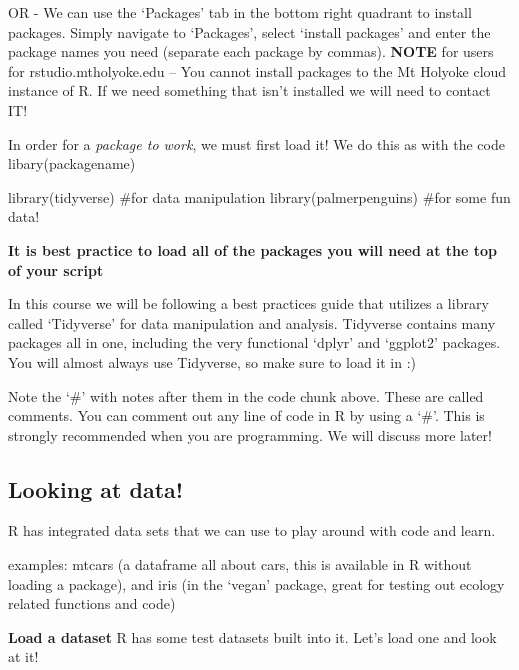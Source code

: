 \documentclass[
  letterpaper,
  DIV=11,
  numbers=noendperiod]{scrartcl}
\newenvironment{Shaded}{\begin{snugshade}}{\end{snugshade}}
\newcommand{\CommentTok}[1]{\textcolor[rgb]{0.37,0.37,0.37}{#1}}
\newcommand{\FunctionTok}[1]{\textcolor[rgb]{0.28,0.35,0.67}{#1}}
\newcommand{\NormalTok}[1]{\textcolor[rgb]{0.00,0.23,0.31}{#1}}
\begin{document}
OR - We can use the `Packages' tab in the bottom right quadrant to
install packages. Simply navigate to `Packages', select `install
packages' and enter the package names you need (separate each package by
commas). \textbf{NOTE} for users for rstudio.mtholyoke.edu -- You cannot
install packages to the Mt Holyoke cloud instance of R. If we need
something that isn't installed we will need to contact IT!

In order for a \emph{package to work}, we must first load it! We do this
as with the code libary(packagename)

\begin{Shaded}
\begin{Highlighting}[]
\FunctionTok{library}\NormalTok{(tidyverse) }\CommentTok{\#for data manipulation}
\FunctionTok{library}\NormalTok{(palmerpenguins) }\CommentTok{\#for some fun data!}
\end{Highlighting}
\end{Shaded}

\textbf{It is best practice to load all of the packages you will need at
the top of your script}

In this course we will be following a best practices guide that utilizes
a library called `Tidyverse' for data manipulation and analysis.
Tidyverse contains many packages all in one, including the very
functional `dplyr' and `ggplot2' packages. You will almost always use
Tidyverse, so make sure to load it in :)

Note the `\#' with notes after them in the code chunk above. These are
called comments. You can comment out any line of code in R by using a
`\#'. This is strongly recommended when you are programming. We will
discuss more later!

\hypertarget{looking-at-data}{%
\subsection{\texorpdfstring{\textbf{Looking at
data!}}{Looking at data!}}\label{looking-at-data}}

R has integrated data sets that we can use to play around with code and
learn.

examples: mtcars (a dataframe all about cars, this is available in R
without loading a package), and iris (in the `vegan' package, great for
testing out ecology related functions and code)

\textbf{Load a dataset} R has some test datasets built into it. Let's
load one and look at it!
\end{document}
